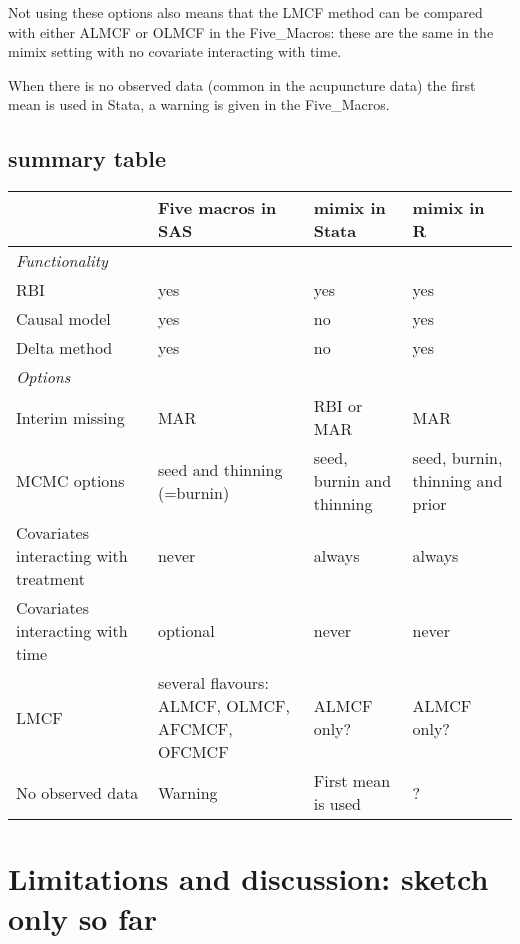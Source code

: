 Not using these options also means that the LMCF method can be compared with either ALMCF or OLMCF in the Five\_Macros: these are the same in the mimix setting with no covariate interacting with time.

When there is no observed data (common in the acupuncture data) the first mean is used in Stata,
a warning is given in the Five\_Macros.

\subsection{summary table}

\begin{tabular}{p{}p{}p{}p{}}\hline
	&	Five macros in SAS	&	mimix in Stata	&	mimix in R	\\\hline
{\em Functionality}	&		&		&		\\
RBI	&	yes	&	yes	&	yes	\\
Causal model	&	yes	&	no	&	yes	\\
Delta method	&	yes	&	no	&	yes	\\\hline
{\em Options}	&		&		&		\\
Interim missing	&	MAR	&	RBI or MAR	&	MAR	\\
MCMC options	&	seed and thinning (=burnin)	&	seed, burnin and thinning	&	seed, burnin, thinning and prior	\\
Covariates interacting with treatment	&	never	&	always	&	always	\\
Covariates interacting with time	&	optional	&	never	&	never	\\
LMCF	&	several flavours: ALMCF, OLMCF, AFCMCF, OFCMCF	&	ALMCF only?	&	ALMCF only?	\\
No observed data	&	Warning	&	First mean is used	&	?	\\\hline
\end{tabular}




\section{Limitations and discussion: sketch only so far}

